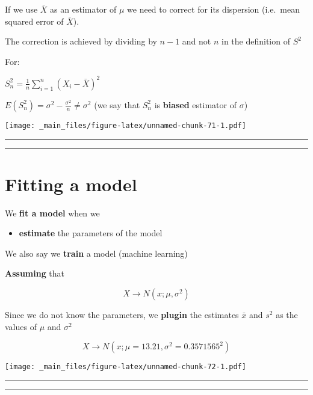 \documentclass[
]{book}
\providecommand{\tightlist}{%
  \setlength{\itemsep}{0pt}\setlength{\parskip}{0pt}}
\begin{document}
If we use \(\bar{X}\) as an estimator of \(\mu\) we need to correct for its dispersion (i.e.~mean squared error of \(\bar{X}\)).

The correction is achieved by dividing by \(n-1\) and not \(n\) in the definition of \(S^2\)

For:

\(S_n^2=\frac{1}{n}\sum_{i=1}^n (X_i-\bar{X})^2\)

\(E(S_n^2) = \sigma^2-\frac{\sigma^2}{n} \neq \sigma^2\) (we say that \(S_n^2\) is \textbf{biased} estimator of \(\sigma\))

\texttt{[image: \_main\_files/figure-latex/unnamed-chunk-71-1.pdf]}

\begin{center}\rule{0.5\linewidth}{0.5pt}\end{center}

\begin{center}\rule{0.5\linewidth}{0.5pt}\end{center}

\hypertarget{fitting-a-model}{%
\section{Fitting a model}\label{fitting-a-model}}

We \textbf{fit a model} when we

\begin{itemize}
\tightlist
\item
  \textbf{estimate} the parameters of the model
\end{itemize}

We also say we \textbf{train} a model (machine learning)

\textbf{Assuming} that

\[X \rightarrow N(x; \mu, \sigma^2)\]

Since we do not know the parameters, we \textbf{plugin} the estimates \(\bar{x}\) and \(s^2\) as the values of \(\mu\)
and \(\sigma^2\)

\[X \rightarrow N(x; \mu=13.21, \sigma^2=0.3571565^2)\]

\texttt{[image: \_main\_files/figure-latex/unnamed-chunk-72-1.pdf]}

\begin{center}\rule{0.5\linewidth}{0.5pt}\end{center}

\begin{center}\rule{0.5\linewidth}{0.5pt}\end{center}
\end{document}
